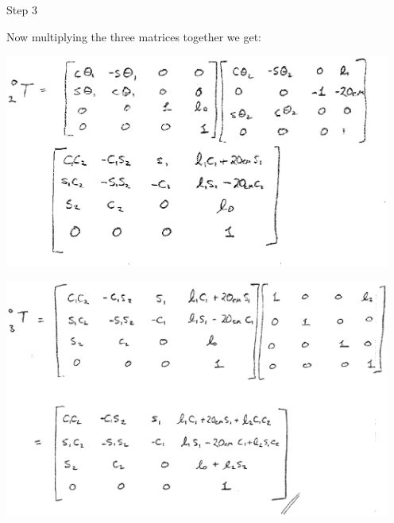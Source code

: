 \begin{ExampleCont}
Step 3

Now multiplying the three matrices together we get:

\includegraphics[width=5.0in]{figs03/00414.eps}

\includegraphics[width=5.0in]{figs03/00415.eps}

\end{ExampleCont}


